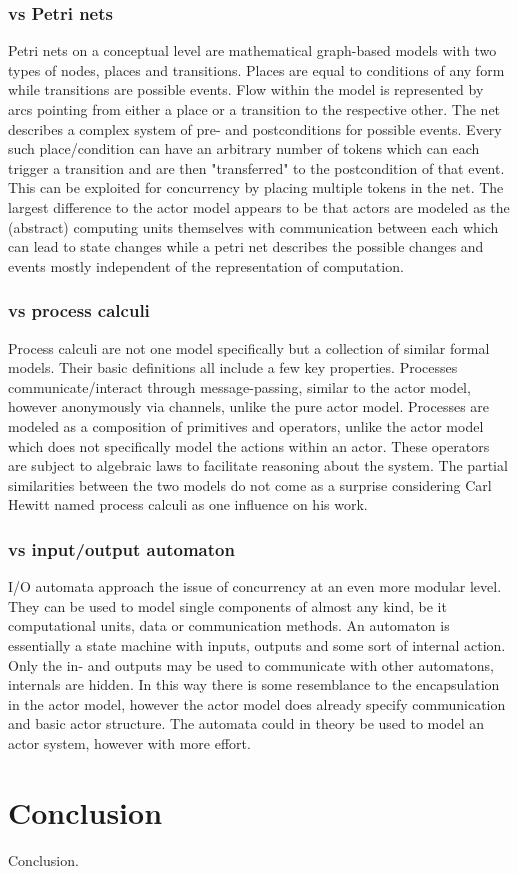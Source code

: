 \documentclass[A4]{article}
\begin{document}
\subsubsection{vs Petri nets}
Petri nets on a conceptual level are mathematical graph-based models with two types of nodes, places and transitions. Places are equal to conditions of any form while transitions are possible events. Flow within the model is represented by arcs pointing from either a place or a transition to the respective other. The net describes a complex system of pre- and postconditions for possible events. Every such place/condition can have an arbitrary number of tokens which can each trigger a transition and are then "transferred" to the postcondition of that event. \cite{Petri1}\cite{Petri2}\cite{murata1989petri}
This can be exploited for concurrency by placing multiple tokens in the net. 
The largest difference to the actor model appears to be that actors are modeled as the (abstract) computing units themselves with communication between each which can lead to state changes while a petri net describes the possible changes and events mostly independent of the representation of computation.
\subsubsection{vs process calculi}
Process calculi are not one model specifically but a collection of similar formal models. Their basic definitions all include a few key properties. Processes communicate/interact through message-passing, similar to the actor model, however anonymously via channels, unlike the pure actor model. Processes are modeled as a composition of primitives and operators, unlike the actor model which does not specifically model the actions within an actor. These operators are subject to algebraic laws to facilitate reasoning about the system. \cite{Baeten:2005:BHP:1085667.1085669} The partial similarities between the two models do not come as a surprise considering Carl Hewitt named process calculi as one influence on his work. 
\subsubsection{vs input/output automaton}
I/O automata approach the issue of concurrency at an even more modular level. They can be used to model single components of almost any kind, be it computational units, data or communication methods. An automaton is essentially a state machine with inputs, outputs and some sort of internal action. Only the in- and outputs may be used to communicate with other automatons, internals are hidden. 
In this way there is some resemblance to the encapsulation in the actor model, however the actor model does already specify communication and basic actor structure. The automata could in theory be used to model an actor system, however with more effort.
\section{Conclusion}
\label{conclusion}
Conclusion.

\nocite{robotron,
stonx,vice,650sim,herculessim,zib,4004,thermal1,thermal2,rojas}




\end{document}
